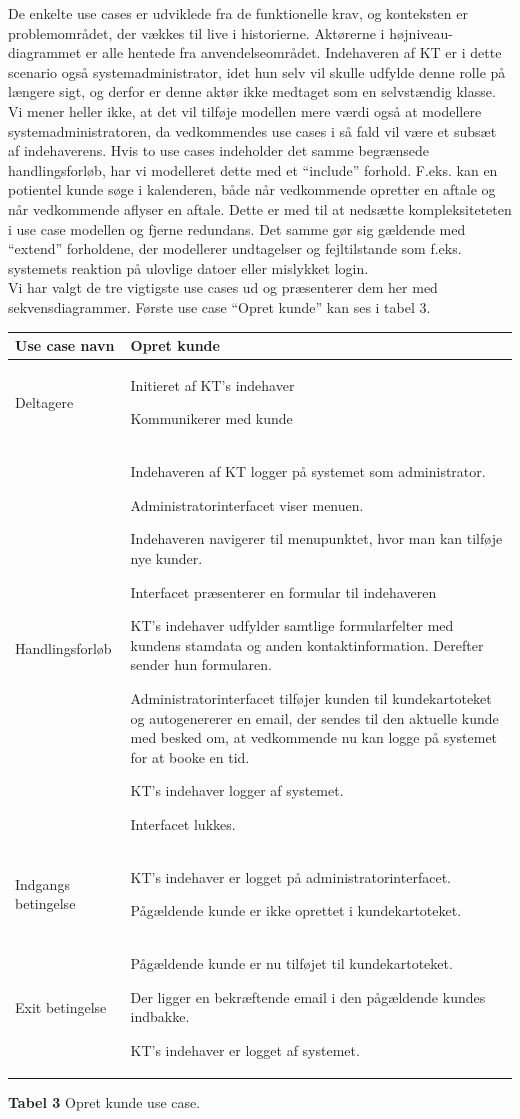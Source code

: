 \documentclass[12pt]{article}   %
\newcommand{\nextitem}{\par\hspace*{\labelsep}\textbullet\hspace*{\labelsep}}
\begin{document}
De enkelte use cases er udviklede fra de funktionelle krav, og konteksten er
problemområdet, der vækkes til live i historierne. 
Aktørerne i højniveau-diagrammet er alle hentede fra anvendelseområdet.
Indehaveren af KT er i dette scenario også systemadministrator, idet hun selv vil
skulle udfylde denne rolle på længere sigt, og derfor er denne aktør ikke
medtaget som en selvstændig klasse. Vi mener heller ikke, at det vil tilføje
modellen mere værdi også at modellere systemadministratoren, da vedkommendes
use cases i så fald vil være et subsæt af indehaverens. Hvis to use cases
indeholder det samme begrænsede handlingsforløb, har vi modelleret dette med
et ``include'' forhold. F.eks. kan en potientel kunde søge i kalenderen, både
når vedkommende opretter en aftale og når vedkommende aflyser en aftale. Dette
er med til at nedsætte kompleksiteteten i use case modellen og fjerne
redundans. Det samme gør sig gældende med ``extend'' forholdene, der
modellerer undtagelser og fejltilstande som f.eks. systemets reaktion på
ulovlige datoer eller mislykket login.\\
Vi har valgt de tre vigtigste use cases ud og præsenterer dem her med 
sekvensdiagrammer. Første use case ``Opret kunde'' kan ses i tabel 3.\\

\begin{tabular}{l p{10cm}}
Use case navn & Opret kunde \\ \hline
Deltagere & \nextitem Initieret af KT's indehaver
            \nextitem Kommunikerer med kunde \\ \hline
Handlingsforløb &
	\nextitem Indehaveren af KT logger på systemet som administrator. 
	\nextitem Administratorinterfacet viser menuen.
	\nextitem Indehaveren navigerer til menupunktet, hvor man kan tilføje nye
		kunder.
		\nextitem Interfacet præsenterer en formular til indehaveren
	\nextitem KT's indehaver udfylder samtlige formularfelter med
		kundens stamdata og anden kontaktinformation. Derefter
		sender hun formularen.		
	\nextitem Administratorinterfacet tilføjer kunden til kundekartoteket
	og autogenererer en email, der sendes til den aktuelle kunde
		med besked om, at vedkommende nu kan logge på systemet for at
		booke en tid.
	\nextitem KT's indehaver logger af systemet. 
	\nextitem Interfacet lukkes.
	\\ \hline
	Indgangs betingelse &
		\nextitem KT's indehaver er logget på administratorinterfacet. 
		\nextitem Pågældende kunde er ikke oprettet i kundekartoteket. 
		\\ \hline
Exit betingelse & 
	\nextitem Pågældende kunde er nu tilføjet til
			kundekartoteket.
		\nextitem Der ligger en bekræftende email i den pågældende kundes
			indbakke.
		\nextitem KT's indehaver er logget af systemet.\\ \hline
\end{tabular}
\begin{center}
\textbf{Tabel 3} Opret kunde use case.
\end{center}
\vspace{0.5cm}
\end{document}
